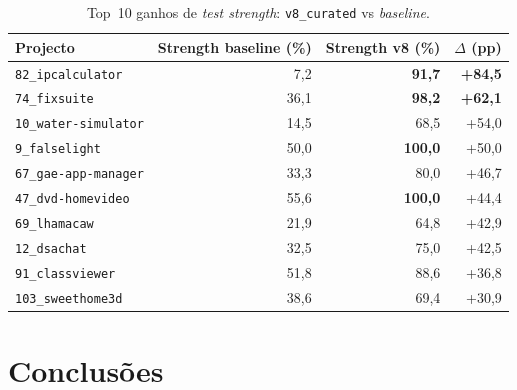 \documentclass[12pt,a4paper]{article}
\begin{document}
\begin{table}[H]
  \centering
  \caption{Top~10 ganhos de \textit{test strength}: \texttt{v8\_curated} vs \textit{baseline}.}
  \label{tab:gains}
  \footnotesize
  \begin{tabular}{lrrr}
    \toprule
    \textbf{Projecto} & \textbf{Strength baseline (\%)} &
    \textbf{Strength v8 (\%)} & \textbf{$\Delta$ (pp)} \\
    \midrule
    \texttt{82\_ipcalculator}     &  7,2 & \textbf{91,7}  & \textbf{+84,5} \\
    \texttt{74\_fixsuite}         & 36,1 & \textbf{98,2}  & \textbf{+62,1} \\
    \texttt{10\_water-simulator}  & 14,5 & 68,5           & +54,0 \\
    \texttt{9\_falselight}        & 50,0 & \textbf{100,0} & +50,0 \\
    \texttt{67\_gae-app-manager}  & 33,3 & 80,0           & +46,7 \\
    \texttt{47\_dvd-homevideo}    & 55,6 & \textbf{100,0} & +44,4 \\
    \texttt{69\_lhamacaw}         & 21,9 & 64,8           & +42,9 \\
    \texttt{12\_dsachat}          & 32,5 & 75,0           & +42,5 \\
    \texttt{91\_classviewer}      & 51,8 & 88,6           & +36,8 \\
    \texttt{103\_sweethome3d}     & 38,6 & 69,4           & +30,9 \\
    \bottomrule
  \end{tabular}
\end{table}

\section{Conclusões}
\end{document}

